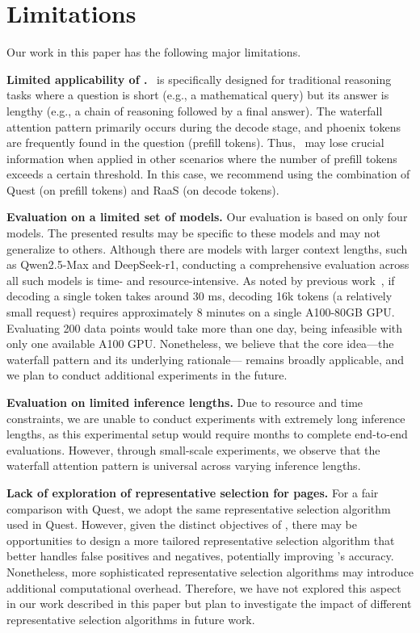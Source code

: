 \section*{Limitations}
\label{sec-limitations}

Our work in this paper has the following major limitations. 

\textbf{Limited applicability of \algo.} \algo\ is specifically designed for traditional reasoning tasks where a question is short (e.g., a mathematical query) but its answer is lengthy (e.g., a chain of reasoning followed by a final answer). The waterfall attention pattern primarily occurs during the decode stage, and phoenix tokens are frequently found in the question (prefill tokens). Thus, \algo\ may lose crucial information when applied in other scenarios where the number of prefill tokens exceeds a certain threshold. In this case, we recommend using the combination of Quest (on prefill tokens) and RaaS (on decode tokens). 

\textbf{Evaluation on a limited set of models.} Our evaluation is based on only four models. The presented results may be specific to these models and may not generalize to others. Although there are models with larger context lengths, such as Qwen2.5-Max and DeepSeek-r1, conducting a comprehensive evaluation across all such models is time- and resource-intensive. As noted by previous work~\cite{zhong2024distserve}, if decoding a single token takes around 30 ms,  decoding 16k tokens (a relatively small request) requires approximately 8 minutes on a single A100-80GB GPU. Evaluating 200 data points would take more than one day, being infeasible with only one available A100 GPU. Nonetheless, we believe that the core idea---the waterfall pattern and its underlying rationale--- remains broadly applicable, and we plan to conduct additional experiments in the future.

\textbf{Evaluation on limited inference lengths.} Due to resource and time constraints, we are unable to conduct experiments with extremely long inference lengths, as this experimental setup would require months to complete end-to-end evaluations. However, through small-scale experiments, we observe that the waterfall attention pattern is universal across varying inference lengths.

\textbf{Lack of exploration of representative selection for pages.} For a fair comparison with Quest, we adopt the same representative selection algorithm used in Quest. However, given the distinct objectives of \algo, there may be opportunities to design a more tailored representative selection algorithm that better handles false positives and negatives, potentially improving \algo’s accuracy. Nonetheless, more sophisticated representative selection algorithms may introduce additional computational overhead. Therefore, we have not explored this aspect in our work described in this paper but plan to investigate the impact of different representative selection algorithms in future work.